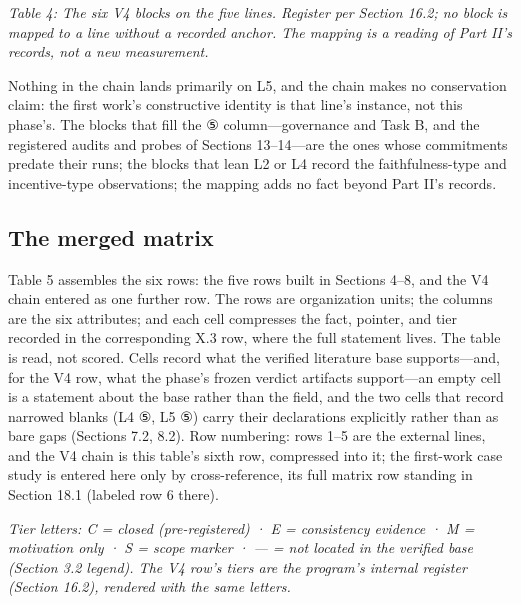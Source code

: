 \documentclass[11pt]{article}
\begin{document}
\endgroup
\begin{center}\emph{Table 4: The six V4 blocks on the five lines. Register per Section 16.2; no block is mapped to a line without a recorded anchor. The mapping is a reading of Part II's records, not a new measurement.}\end{center}
\noindent Nothing in the chain lands primarily on L5, and the chain makes no conservation claim: the first work's constructive identity is that line's instance, not this phase's. The blocks that fill the ⑤ column—governance and Task B, and the registered audits and probes of Sections 13–14—are the ones whose commitments predate their runs; the blocks that lean L2 or L4 record the faithfulness-type and incentive-type observations; the mapping adds no fact beyond Part II's records.\par
\subsection{The merged matrix}
\noindent Table 5 assembles the six rows: the five rows built in Sections 4–8, and the V4 chain entered as one further row. The rows are organization units; the columns are the six attributes; and each cell compresses the fact, pointer, and tier recorded in the corresponding X.3 row, where the full statement lives. The table is read, not scored. Cells record what the verified literature base supports—and, for the V4 row, what the phase's frozen verdict artifacts support—an empty cell is a statement about the base rather than the field, and the two cells that record narrowed blanks (L4 ⑤, L5 ⑤) carry their declarations explicitly rather than as bare gaps (Sections 7.2, 8.2). Row numbering: rows 1–5 are the external lines, and the V4 chain is this table's sixth row, compressed into it; the first-work case study is entered here only by cross-reference, its full matrix row standing in Section 18.1 (labeled row 6 there).\par
\noindent\emph{Tier letters: C = closed (pre-registered) · E = consistency evidence · M = motivation only · S = scope marker · — = not located in the verified base (Section 3.2 legend). The V4 row's tiers are the program's internal register (Section 16.2), rendered with the same letters.}\par
\begingroup\scriptsize
\setlength{\tabcolsep}{2.5pt}\renewcommand{\arraystretch}{1.18}
\end{document}
